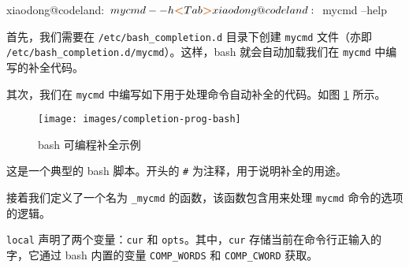 \documentclass[]{ctexbook}
\newenvironment{Shaded}{\begin{snugshade}}{\end{snugshade}}
\newcommand{\BuiltInTok}[1]{#1}
\newcommand{\CommentTok}[1]{\textcolor[rgb]{0.56,0.35,0.01}{\textit{#1}}}
\newcommand{\ExtensionTok}[1]{#1}
\newcommand{\FunctionTok}[1]{\textcolor[rgb]{0.00,0.00,0.00}{#1}}
\newcommand{\KeywordTok}[1]{\textcolor[rgb]{0.13,0.29,0.53}{\textbf{#1}}}
\newcommand{\NormalTok}[1]{#1}
\newcommand{\OperatorTok}[1]{\textcolor[rgb]{0.81,0.36,0.00}{\textbf{#1}}}
\newcommand{\OtherTok}[1]{\textcolor[rgb]{0.56,0.35,0.01}{#1}}
\newcommand{\StringTok}[1]{\textcolor[rgb]{0.31,0.60,0.02}{#1}}
\newcommand{\VariableTok}[1]{\textcolor[rgb]{0.00,0.00,0.00}{#1}}
\begin{document}
\begin{Shaded}
\begin{Highlighting}[]
\ExtensionTok{xiaodong@codeland}\NormalTok{:~$ mycmd --h}\OperatorTok{<}\NormalTok{Tab}\OperatorTok{>}
\ExtensionTok{xiaodong@codeland}\NormalTok{:~$ mycmd --help}
\end{Highlighting}
\end{Shaded}

首先，我们需要在 \texttt{/etc/bash\_completion.d} 目录下创建 \texttt{mycmd} 文件（亦即 \texttt{/etc/bash\_completion.d/mycmd}）。这样，bash 就会自动加载我们在 \texttt{mycmd} 中编写的补全代码。

其次，我们在 \texttt{mycmd} 中编写如下用于处理命令自动补全的代码。如图 \ref{fig:completion-prog-bash} 所示。

\begin{Shaded}
\end{Shaded}

\begin{figure}
\texttt{[image: images/completion-prog-bash]} \caption{bash 可编程补全示例}\label{fig:completion-prog-bash}
\end{figure}

这是一个典型的 bash 脚本。开头的 \texttt{\#} 为注释，用于说明补全的用途。

接着我们定义了一个名为 \texttt{\_mycmd} 的函数，该函数包含用来处理 \texttt{mycmd} 命令的选项的逻辑。

\texttt{local} 声明了两个变量：\texttt{cur} 和 \texttt{opts}。其中，\texttt{cur} 存储当前在命令行正输入的字，它通过 bash 内置的变量 \texttt{COMP\_WORDS} 和 \texttt{COMP\_CWORD} 获取。
\end{document}
